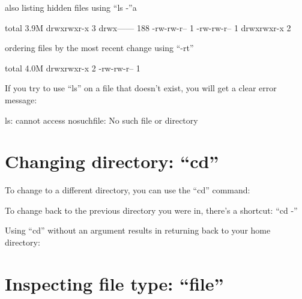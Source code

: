 \item also listing hidden files using ``ls -''a
\begin{prompt}
total 3.9M
drwxrwxr-x   3 %
drwx------ 188 %
-rw-rw-r--   1 %
-rw-rw-r--   1 %
drwxrwxr-x   2 %
\end{prompt}

\item ordering files by the most recent change using ``-rt''

\begin{prompt}
total 4.0M
drwxrwxr-x 2 %
-rw-rw-r-- 1 %
\end{prompt}

If you try to use ``ls'' on a file that doesn't exist, you will get a clear error message:

\begin{prompt}
ls: cannot access nosuchfile: No such file or directory
\end{prompt}

\section{Changing directory: ``cd''}

To change to a different directory, you can use the ``cd'' command:

\begin{prompt}
\end{prompt}

To change back to the previous directory you were in, there's a shortcut: ``cd -''

Using ``cd'' without an argument results in returning back to your home directory:

\begin{prompt}
\end{prompt}

\section{Inspecting file type: ``file''}

